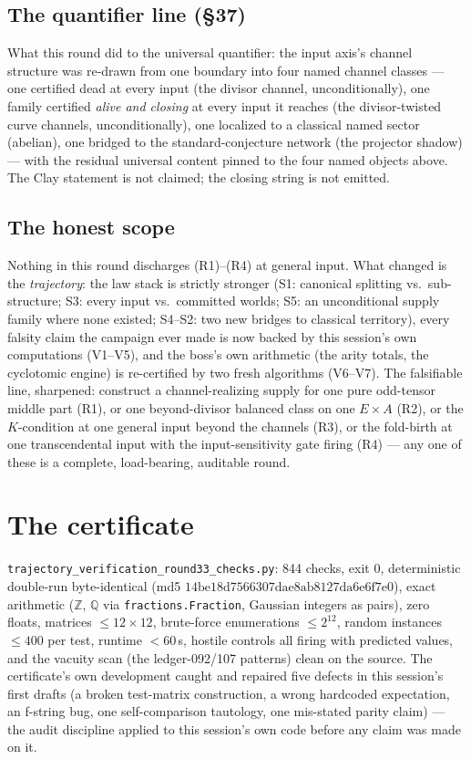 \documentclass[11pt]{article}
\newcommand{\Z}{\mathbb{Z}}
\newcommand{\Q}{\mathbb{Q}}
\begin{document}
\subsection*{The quantifier line (\S37)}
What this round did to the universal quantifier: the input axis's channel
structure was re-drawn from one boundary into four named channel classes ---
one certified dead at every input (the divisor channel, unconditionally),
one family certified \emph{alive and closing} at every input it reaches (the
divisor-twisted curve channels, unconditionally), one localized to a
classical named sector (abelian), one bridged to the standard-conjecture
network (the projector shadow) --- with the residual universal content
pinned to the four named objects above. The Clay statement is not claimed;
the closing string is not emitted.

\subsection*{The honest scope}
Nothing in this round discharges (R1)--(R4) at general input. What changed
is the \emph{trajectory}: the law stack is strictly stronger (S1: canonical
splitting vs.\ sub-structure; S3: every input vs.\ committed worlds; S5: an
unconditional supply family where none existed; S4--S2: two new bridges to
classical territory), every falsity claim the campaign ever made is now
backed by this session's own computations (V1--V5), and the boss's own
arithmetic (the arity totals, the cyclotomic engine) is re-certified by two
fresh algorithms (V6--V7). The falsifiable line, sharpened: construct a
channel-realizing supply for one pure odd-tensor middle part (R1), or one
beyond-divisor balanced class on one $E\times A$ (R2), or the $K$-condition
at one general input beyond the channels (R3), or the fold-birth at one
transcendental input with the input-sensitivity gate firing (R4) --- any one
of these is a complete, load-bearing, auditable round.

\section{The certificate}

\texttt{trajectory\_verification\_round33\_checks.py}: 844 checks, exit 0,
deterministic double-run byte-identical (md5
$14\mathrm{be}18\mathrm{d}7566307\mathrm{dae}8\mathrm{ab}8127\mathrm{da}6\mathrm{e}6\mathrm{f}7\mathrm{e}0$),
exact arithmetic ($\Z$, $\Q$ via \texttt{fractions.Fraction}, Gaussian
integers as pairs), zero floats, matrices $\le12\times12$, brute-force
enumerations $\le2^{12}$, random instances $\le400$ per test, runtime
$<60$\,s, hostile controls all firing with predicted values, and the
vacuity scan (the ledger-092/107 patterns) clean on the source. The
certificate's own development caught and repaired five defects in this
session's first drafts (a broken test-matrix construction, a wrong
hardcoded expectation, an f-string bug, one self-comparison tautology, one
mis-stated parity claim) --- the audit discipline applied to this session's
own code before any claim was made on it.
\end{document}
